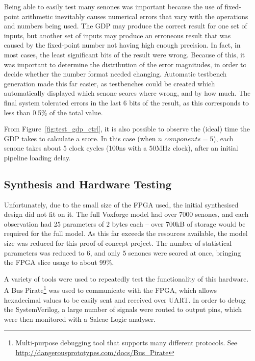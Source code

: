 	Being able to easily test many senones was important because the use of fixed-point arithmetic inevitably causes numerical errors that vary with the operations and numbers being used.  The GDP may produce the correct result for one set of inputs, but another set of inputs may produce an erroneous result that was caused by the fixed-point number not having high enough precision.  In fact, in most cases, the least significant bits of the result were wrong.  Because of this, it was important to determine the distribution of the error magnitudes, in order to decide whether the number format needed changing.  Automatic testbench generation made this far easier, as testbenches could be created which automatically displayed which senone scores where wrong, and by how much.  The final system tolerated errors in the last 6 bits of the result, as this corresponds to less than 0.5\% of the total value.


	From Figure~\ref{fig:test_gdp_ctrl}, it is also possible to observe the (ideal) time the GDP takes to calculate a score.  In this case (when $n\_components=5$), each senone takes about 5 clock cycles (100ns with a 50MHz clock), after an initial pipeline loading delay.

	\subsection{Synthesis and Hardware Testing} %
	\label{sub:gdp_synthesis_and_hardware_testing}
		Unfortunately, due to the small size of the FPGA used, the initial synthesised design did not fit on it.  The full Voxforge model had over 7000 senones, and each observation had 25 parameters of 2 bytes each -- over 700kB of storage would be required for the full model.  As this far exceeds the resources available, the model size was reduced for this proof-of-concept project.  The number of statistical parameters was reduced to 6, and only 5 senones were scored at once, bringing the FPGA slice usage to about 99\%.  %

		A variety of tools were used to repeatedly test the functionality of this hardware.  A Bus Pirate\footnote{Multi-purpose debugging tool that supports many different protocols.  See \href{http://dangerousprototypes.com/docs/Bus_Pirate}{http://dangerousprototypes.com/docs/Bus\_Pirate}} was used to communicate with the FPGA, which allows hexadecimal values to be easily sent and received over UART.  In order to debug the SystemVerilog, a large number of signals were routed to output pins, which were then monitored with a Saleae Logic analyser.


